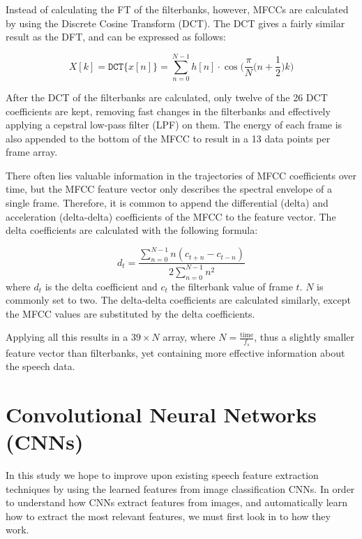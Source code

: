 Instead of calculating the FT of the filterbanks, however, MFCCs are calculated by using the Discrete Cosine Transform (DCT).
The DCT gives a fairly similar result as the DFT, and can be expressed as follows:

\begin{equation}
    X[k] = \mathtt{DCT} \{ x[n] \} = \displaystyle\sum_{n=0}^{N-1} h[n] \cdot \cos\bigg(\displaystyle\frac{\pi}{N}\Big(n+\frac{1}{2}\Big)k\bigg)
\end{equation}

After the DCT of the filterbanks are calculated, only twelve of the 26 DCT coefficients are kept, removing fast changes in the filterbanks and effectively applying a cepstral low-pass filter (LPF) on them. 
The energy of each frame is also appended to the bottom of the MFCC to result in a 13 data points per frame array.

There often lies valuable information in the trajectories of MFCC coefficients over time, but the MFCC feature vector only describes the spectral envelope of a single frame.
Therefore, it is common to append the differential (delta) and acceleration (delta-delta) coefficients of the MFCC to the feature vector. 
The delta coefficients are calculated with the following formula:

\begin{equation}
    d_t=\displaystyle\frac{\sum_{n=0}^{N-1} n(c_{t+n}-c_{t-n})}{2\sum_{n=0}^{N-1} n^2}
\end{equation}
where $d_t$ is the delta coefficient and $c_t$ the filterbank value of frame $t$.
$N$ is commonly set to two. 
The delta-delta coefficients are calculated similarly, except the MFCC values are substituted by the delta coefficients.

Applying all this results in a $39\times N$ array, where $N = \frac{\mathrm{time}}{f_s}$, thus a slightly smaller feature vector than filterbanks, yet containing more effective information about the speech data.

\section{Convolutional Neural Networks (CNNs)}

In this study we hope to improve upon existing speech feature extraction techniques by using the learned features from image classification CNNs. 
In order to understand how CNNs extract features from images, and automatically learn how to extract the most relevant features, we must first look in to how they work.

